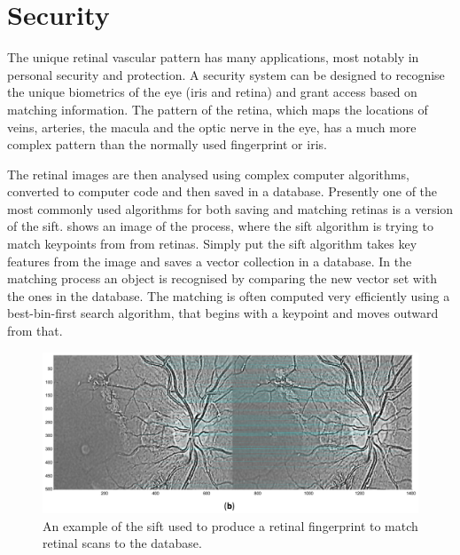 \section{Security}

The unique retinal vascular pattern has many applications, most notably in
personal security and protection. A security system can be designed to recognise
the unique biometrics of the eye (iris and retina) and grant access based on
matching information. The pattern of the retina, which maps the locations
of veins, arteries, the macula and the optic nerve in the eye, has a much
more complex pattern than the normally used fingerprint or iris.\cite{ortega_2009}

The retinal images are then analysed using complex computer algorithms,
converted to computer code and then saved in a database. Presently one
of the most commonly used algorithms for both saving and matching retinas
is a version of the \Gls{sift}.  shows an image of the process,
where the \Gls{sift} algorithm is trying to match keypoints from from retinas.
Simply put the \Gls{sift} algorithm takes key features from the image and
saves a vector collection in a database. In the matching process an object is
recognised by comparing the new vector set with the ones in the database.
The matching is often computed very efficiently using a best-bin-first search
algorithm, that begins with a keypoint and moves outward from that.

\begin{figure}[H]
\centering
\includegraphics{figures/sift}
\caption{An example of the \Gls{sift} used to produce a retinal fingerprint
              to match retinal scans to the database.\cite{Martinez-Perez:12}}
\label{fig:sift}
\end{figure}

